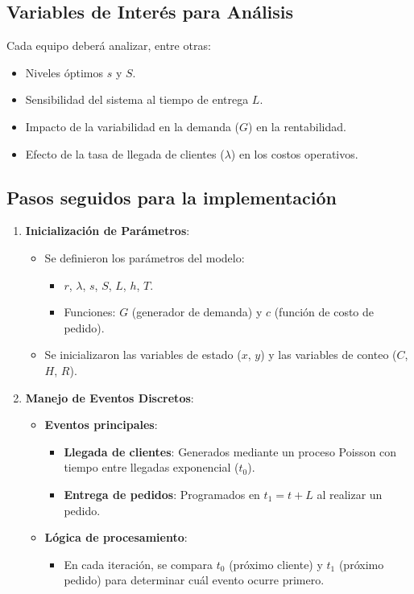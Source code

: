 \documentclass[a4paper,12pt]{article}
\begin{document}
\begin{itemize}
\subsection*{Variables de Interés para Análisis}
Cada equipo deberá analizar, entre otras:
\begin{itemize}
    \item Niveles óptimos \( s \) y \( S \).
    \item Sensibilidad del sistema al tiempo de entrega \( L \).
    \item Impacto de la variabilidad en la demanda (\( G \)) en la rentabilidad.
    \item Efecto de la tasa de llegada de clientes (\( \lambda \)) en los costos operativos.
\end{itemize}

\subsection*{Pasos seguidos para la implementación}
\begin{enumerate}
    \item \textbf{Inicialización de Parámetros}:
    \begin{itemize}
        \item Se definieron los parámetros del modelo:
        \begin{itemize}
            \item \( r \), \( \lambda \), \( s \), \( S \), \( L \), \( h \), \( T \).
            \item Funciones: \( G \) (generador de demanda) y \( c \) (función de costo de pedido).
        \end{itemize}
        \item Se inicializaron las variables de estado (\( x \), \( y \)) y las variables de conteo (\( C \), \( H \), \( R \)).
    \end{itemize}

    \item \textbf{Manejo de Eventos Discretos}:
    \begin{itemize}
        \item \textbf{Eventos principales}:
        \begin{itemize}
            \item \textbf{Llegada de clientes}: Generados mediante un proceso Poisson con tiempo entre llegadas exponencial (\( t_0 \)).
            \item \textbf{Entrega de pedidos}: Programados en \( t_1 = t + L \) al realizar un pedido.
        \end{itemize}
        \item \textbf{Lógica de procesamiento}:
        \begin{itemize}
            \item En cada iteración, se compara \( t_0 \) (próximo cliente) y \( t_1 \) (próximo pedido) para determinar cuál evento ocurre primero.
        \end{itemize}
    \end{itemize}


\end{enumerate}
\end{itemize}
\end{document}
